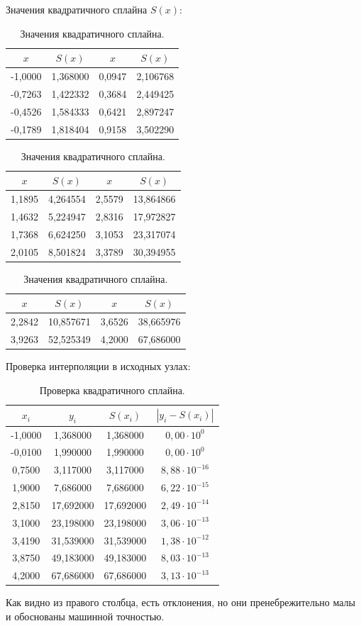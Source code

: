 \documentclass[14pt,a4paper]{extarticle}
\begin{document}
Значения квадратичного сплайна $S(x)$:

\begin{table}[h]
\centering
\caption{Значения квадратичного сплайна.}
\begin{tabular}{|c|c||c|c|}
\hline
$x$ & $S(x)$ & $x$ & $S(x)$ \\ \hline
-1,0000 & 1,368000 & 0,0947 & 2,106768 \\
-0,7263 & 1,422332 & 0,3684 & 2,449425 \\
-0,4526 & 1,584333 & 0,6421 & 2,897247 \\
-0,1789 & 1,818404 & 0,9158 & 3,502290 \\ \hline
\end{tabular}
\begin{tabular}{|c|c||c|c|}
\hline
$x$ & $S(x)$ & $x$ & $S(x)$ \\ \hline
1,1895 & 4,264554 & 2,5579 & 13,864866 \\
1,4632 & 5,224947 & 2,8316 & 17,972827 \\
1,7368 & 6,624250 & 3,1053 & 23,317074 \\
2,0105 & 8,501824 & 3,3789 & 30,394955 \\ \hline
\end{tabular}
\begin{tabular}{|c|c||c|c|}
\hline
$x$ & $S(x)$ & $x$ & $S(x)$ \\ \hline
2,2842 & 10,857671 & 3,6526 & 38,665976 \\
3,9263 & 52,525349 & 4,2000 & 67,686000 \\ \hline
\end{tabular}
\end{table}

Проверка интерполяции в исходных узлах:

\begin{table}[h]
\centering
\caption{Проверка квадратичного сплайна.}
\begin{tabular}{|c|c|c|c|}
\hline
$x_i$ & $y_i$ & $S(x_i)$ & $\left|y_i - S(x_i)\right|$ \\ \hline
-1,0000 & 1,368000 & 1,368000 & $0{,}00 \cdot 10^{0}$ \\
-0,0100 & 1,990000 & 1,990000 & $0{,}00 \cdot 10^{0}$ \\
0,7500 & 3,117000 & 3,117000 & $8{,}88 \cdot 10^{-16}$ \\
1,9000 & 7,686000 & 7,686000 & $6{,}22 \cdot 10^{-15}$ \\
2,8150 & 17,692000 & 17,692000 & $2{,}49 \cdot 10^{-14}$ \\
3,1000 & 23,198000 & 23,198000 & $3{,}06 \cdot 10^{-13}$ \\
3,4190 & 31,539000 & 31,539000 & $1{,}38 \cdot 10^{-12}$ \\
3,8750 & 49,183000 & 49,183000 & $8{,}03 \cdot 10^{-13}$ \\
4,2000 & 67,686000 & 67,686000 & $3{,}13 \cdot 10^{-13}$ \\ \hline
\end{tabular}

Как видно из правого столбца, есть отклонения, но они пренебрежительно малы и обоснованы машинной точностью.

\end{table}
\end{document}

